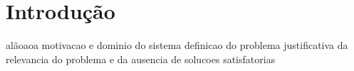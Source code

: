 
\chapter{Introdu\c{c}\~ao}

alãoaoa
motivacao e dominio do sistema
definicao do problema
justificativa da relevancia do problema e da ausencia de solucoes satisfatorias 

